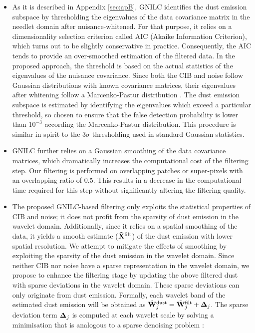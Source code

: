 \documentclass[a4paper,fleqn,usenatbib]{mnras}
\begin{document}
\begin{itemize}
\item As it is described in Appendix \ref{sec:apB}, GNILC identifies the dust emission subspace by thresholding the eigenvalues of the data covariance matrix in the needlet domain after nuisance-whitened. For that purpose, it relies on a dimensionality selection criterion called AIC (Akaike Information Criterion), which turns out to be slightly conservative in practice. Consequently, the AIC tends to provide an over-smoothed estimation of the filtered data. In the proposed approach, the threshold is based on the actual statistics of the eigenvalues of the nuisance covariance. Since both the CIB and noise follow Gaussian distributions with known covariance matrices, their eigenvalues after whitening follow a Marcenko-Pastur distribution \citep{Mehta}. The dust emission subspace is estimated by identifying the eigenvalues which exceed a particular threshold, so chosen to ensure that the false detection probability is lower than $ 10^ {-3}$ according the Marcenko-Pastur distribution. This procedure is similar in spirit to the $3 \sigma$ thresholding used in standard Gaussian statistics. \\

\item GNILC further relies on a Gaussian smoothing of the data covariance matrices, which dramatically increases the computational cost of the filtering step. Our filtering is performed on overlapping patches or super-pixels with an overlapping ratio of $0.5$. This results in a decrease in the computational time required for this step without significantly altering the filtering quality.\\ 

\item The proposed GNILC-based filtering only exploits the statistical properties of CIB and noise; it does not profit from the sparsity of dust emission in the wavelet domain. Additionally, since it relies on a spatial smoothing of the data, it yields a smooth estimate (${\tilde{\bf{X}}}^{\rm{filt}}$) of the dust emission with lower spatial resolution. We attempt to mitigate the effects of smoothing by exploiting the sparsity of the dust emission in the wavelet domain. Since neither CIB nor noise have a sparse representation in the wavelet domain, we propose to enhance the filtering stage by updating the above filtered dust with sparse deviations in the wavelet domain. These sparse deviations can only originate from dust emission. Formally, each wavelet band of the estimated dust emission will be obtained as $\tilde{\bf W}_j^{\rm{dust}}  = \tilde{\bf W}_j^{\rm{filt}} + {\bf \Delta}_j$. The sparse deviation term ${\bf \Delta}_j$ is computed at each wavelet scale by solving a minimisation that is analogous to a sparse denoising problem \citep{starck2010sparse}:


\end{itemize}
\end{document}
